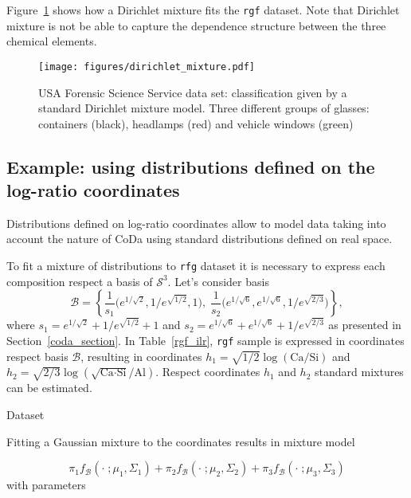 \documentclass[10pt, a4paper]{article}
\begin{document}
Figure~\ref{fig06fittingdirichlet} shows how a Dirichlet mixture fits the \texttt{rgf} dataset. Note that Dirichlet mixture is not be able to capture the dependence structure between the three chemical elements. 

\begin{figure}[htbp]
\centering
\texttt{[image: figures/dirichlet\_mixture.pdf]}
\caption{USA Forensic Science Service data set: classification given by a standard Dirichlet mixture model. Three different groups of glasses: containers (black), headlamps (red) and vehicle windows (green)}
\label{fig06fittingdirichlet}
\end{figure}

\subsection*{Example: using distributions defined on the log-ratio coordinates}

Distributions defined on log-ratio coordinates allow to model data taking into account the nature of CoDa using standard distributions defined on real space.

To fit a mixture of distributions to \texttt{rfg} dataset it is necessary to express each composition respect a basis of $\mathcal{S}^3$. Let's consider basis 
\begin{equation}
\mathcal{B} = \left\{ \frac{1}{s_1}\Big( e^{1/\sqrt{2}}, 1/e^{\sqrt{1/2}}, 1 \Big), \; \frac{1}{s_2}\Big( e^{1/\sqrt{6}}, e^{1/\sqrt{6}}, 1/e^{\sqrt{2/3}} \Big) \right\},
\end{equation}
where $s_1 = e^{1/\sqrt{2}} + 1/e^{\sqrt{ 1/2}} + 1$ and $s_2= e^{1/\sqrt{6}} + e^{1/\sqrt{6}} + 1/e^{\sqrt{2/3}}$ as presented in Section~\ref{coda_section}. In Table~\ref{rgf_ilr}, \texttt{rgf} sample is expressed in coordinates respect basis $\mathcal{B}$, resulting in coordinates $h_1 = \sqrt{1/2} \log(\text{Ca}/\text{Si})$ and $h_2 = \sqrt{2/3} \log(\sqrt{\text{Ca} \cdot \text{Si}} / \text{Al})$. Respect coordinates $h_1$ and $h_2$ standard mixtures can be estimated.

\begin{table}
\centering
\scriptsize

\quad

\label{rgf_ilr}
\caption{Dataset}
\end{table}

Fitting a Gaussian mixture to the coordinates results in mixture model

\begin{equation}\label{coda_mixture}
\pi_1 f_{\mathcal{B}}(\cdot\;; \mu_1, \Sigma_1) + \pi_2 f_{\mathcal{B}}(\cdot\;; \mu_2, \Sigma_2) + \pi_3 f_{\mathcal{B}}(\cdot\;; \mu_3, \Sigma_3)
\end{equation}
with parameters
\end{document}
